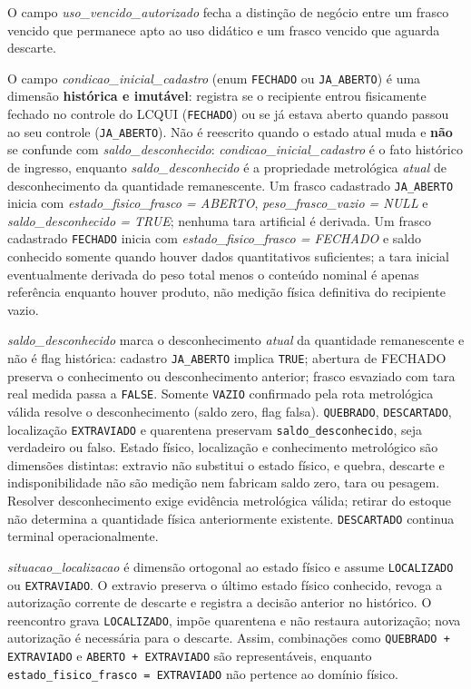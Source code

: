 \begin{explicacao}
O campo \textit{uso\_vencido\_autorizado} fecha a distinção de negócio entre um frasco vencido que permanece apto ao uso didático e um frasco vencido que aguarda descarte.

O campo \textit{condicao\_inicial\_cadastro} (enum \texttt{FECHADO} ou \texttt{JA\_ABERTO}) é uma dimensão \textbf{histórica e imutável}: registra se o recipiente entrou fisicamente fechado no controle do LCQUI (\texttt{FECHADO}) ou se já estava aberto quando passou ao seu controle (\texttt{JA\_ABERTO}). Não é reescrito quando o estado atual muda e \textbf{não} se confunde com \textit{saldo\_desconhecido}: \textit{condicao\_inicial\_cadastro} é o fato histórico de ingresso, enquanto \textit{saldo\_desconhecido} é a propriedade metrológica \emph{atual} de desconhecimento da quantidade remanescente. Um frasco cadastrado \texttt{JA\_ABERTO} inicia com \textit{estado\_fisico\_frasco = ABERTO}, \textit{peso\_frasco\_vazio = NULL} e \textit{saldo\_desconhecido = TRUE}; nenhuma tara artificial é derivada. Um frasco cadastrado \texttt{FECHADO} inicia com \textit{estado\_fisico\_frasco = FECHADO} e saldo conhecido somente quando houver dados quantitativos suficientes; a tara inicial eventualmente derivada do peso total menos o conteúdo nominal é apenas referência enquanto houver produto, não medição física definitiva do recipiente vazio.

\textit{saldo\_desconhecido} marca o desconhecimento \emph{atual} da quantidade remanescente e não é flag histórica: cadastro \texttt{JA\_ABERTO} implica \texttt{TRUE}; abertura de FECHADO preserva o conhecimento ou desconhecimento anterior; frasco esvaziado com tara real medida passa a \texttt{FALSE}. Somente \texttt{VAZIO} confirmado pela rota metrológica válida resolve o desconhecimento (saldo zero, flag falsa). \texttt{QUEBRADO}, \texttt{DESCARTADO}, localização \texttt{EXTRAVIADO} e quarentena preservam \texttt{saldo\_desconhecido}, seja verdadeiro ou falso. Estado físico, localização e conhecimento metrológico são dimensões distintas: extravio não substitui o estado físico, e quebra, descarte e indisponibilidade não são medição nem fabricam saldo zero, tara ou pesagem. Resolver desconhecimento exige evidência metrológica válida; retirar do estoque não determina a quantidade física anteriormente existente. \texttt{DESCARTADO} continua terminal operacionalmente.

\textit{situacao\_localizacao} é dimensão ortogonal ao estado físico e assume \texttt{LOCALIZADO} ou \texttt{EXTRAVIADO}. O extravio preserva o último estado físico conhecido, revoga a autorização corrente de descarte e registra a decisão anterior no histórico. O reencontro grava \texttt{LOCALIZADO}, impõe quarentena e não restaura autorização; nova autorização é necessária para o descarte. Assim, combinações como \texttt{QUEBRADO + EXTRAVIADO} e \texttt{ABERTO + EXTRAVIADO} são representáveis, enquanto \texttt{estado\_fisico\_frasco = EXTRAVIADO} não pertence ao domínio físico.


\end{explicacao}
